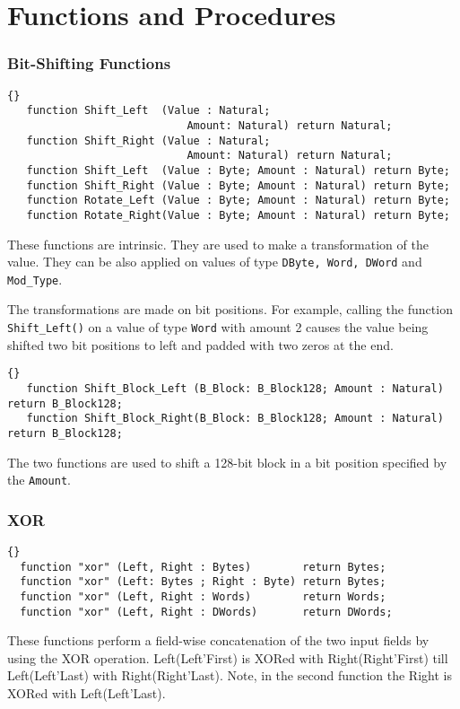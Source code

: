
\section{Functions and Procedures}
\subsubsection{Bit-Shifting Functions}
\begin{lstlisting}{}
   function Shift_Left  (Value : Natural;
                		    Amount: Natural) return Natural;
   function Shift_Right (Value : Natural;
   						    Amount: Natural) return Natural;
   function Shift_Left  (Value : Byte; Amount : Natural) return Byte;
   function Shift_Right (Value : Byte; Amount : Natural) return Byte;
   function Rotate_Left (Value : Byte; Amount : Natural) return Byte;
   function Rotate_Right(Value : Byte; Amount : Natural) return Byte;
\end{lstlisting}
These functions are intrinsic. They are used to make a transformation
of the value. They can be also applied on values of type
\texttt{DByte, Word, DWord} and \texttt{Mod\_Type}.

The transformations are made on bit positions. For example, calling
the function \texttt{Shift\_Left()} on a value of type \texttt{Word}
with amount 2 causes the value being shifted two bit positions to left
and padded with two zeros at the end.\\
\begin{lstlisting}{}
   function Shift_Block_Left (B_Block: B_Block128; Amount : Natural) return B_Block128;
   function Shift_Block_Right(B_Block: B_Block128; Amount : Natural) return B_Block128;
\end{lstlisting}
The two functions are used to shift a 128-bit block in a bit position
specified by the \texttt{Amount}.

\hhline
\subsubsection*{XOR}
\begin{lstlisting}{}
  function "xor" (Left, Right : Bytes)        return Bytes;
  function "xor" (Left: Bytes ; Right : Byte) return Bytes;
  function "xor" (Left, Right : Words)        return Words;
  function "xor" (Left, Right : DWords)       return DWords;
\end{lstlisting}
These functions perform a field-wise concatenation of the two input
fields by using the XOR operation. Left(Left'First) is XORed with
Right(Right'First) till Left(Left'Last) with Right(Right'Last). Note,
in the second function the Right is XORed with Left(Left'Last).\\


